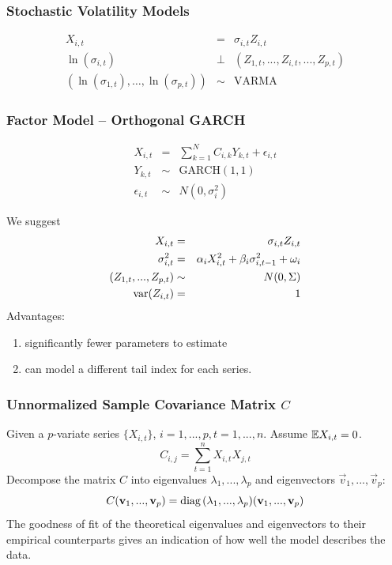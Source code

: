 \documentclass{beamer}
\begin{document}
\begin{frame}
  \frametitle{Stochastic Volatility Models}
  \begin{eqnarray*}
    X_{i,t} &=& \sigma_{i, t} Z_{i, t} \\
    \ln(\sigma_{i,t}) &\bot& (Z_{1, t}, ..., Z_{i, t}, ..., Z_{p,t}) \\
    (\ln(\sigma_{1,t}), \dots, \ln(\sigma_{p,t})) &\sim& \text{VARMA}
  \end{eqnarray*}
\end{frame}

\begin{frame}
  \frametitle{Factor Model -- Orthogonal GARCH}
  \begin{eqnarray*}
    X_{i, t} &=& \sum_{k=1}^N C_{i,k} Y_{k, t} + \epsilon_{i, t} \\
    Y_{k, t} &\sim& \text{GARCH}(1,1) \\
    \epsilon_{i,t} &\sim& N(0, \sigma_i^2)
  \end{eqnarray*}
\end{frame}

\begin{frame}
  We suggest
  \begin{eqnarray*}
    X_{i, t} &=& \sigma_{i, t} Z_{i, t} \\
    \sigma_{i, t}^2 &=& \alpha_{i} X_{i, t}^2 + \beta_{i} \sigma_{i, t-1}^2 + \omega_i \\
    (Z_{1, t}, ..., Z_{p, t}) &\sim& N(0, \Sigma) \\
    \text{var}(Z_{i,t}) &=& 1
  \end{eqnarray*}
  Advantages:
  \begin{enumerate}
  \item significantly fewer parameters to estimate
  \item can model a different tail index for each series.
  \end{enumerate}
\end{frame}

\begin{frame}
  \frametitle{Unnormalized Sample Covariance Matrix $C$}
  Given a $p$-variate series $\{X_{i, t}\}$, $i=1,...,p, t=1,...,n$.
  Assume $\mathbb{E} X_{i, t} = 0$.
  \[
  C_{i, j} = \sum_{t=1}^n X_{i,t} X_{j,t}
  \]
  Decompose the matrix $C$ into eigenvalues $\lambda_1, ...,
  \lambda_p$ and eigenvectors $\vec v_1, ..., \vec v_p$:
  \[
  C (\mathbf{v}_1, ..., \mathbf{v}_p) = \text{diag\,}(\lambda_1, ..., \lambda_p) (\mathbf{v}_1, ..., \mathbf{v}_p)
  \]
  The goodness of fit of the theoretical eigenvalues and eigenvectors
  to their empirical counterparts gives an indication of how well the
  model describes the data.
\end{frame}
\end{document}
